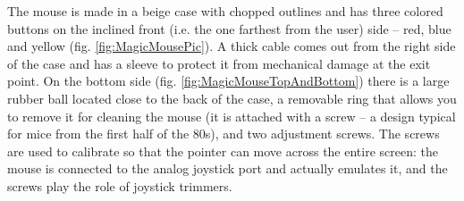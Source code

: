 \documentclass[11pt, a4paper]{article}
\begin{document}
The mouse is made in a beige case with chopped outlines and has three colored buttons on the inclined front (i.e. the one farthest from the user) side -- red, blue and yellow (fig. \ref{fig:MagicMousePic}). A thick cable comes out from the right side of the case and has a sleeve to protect it from mechanical damage at the exit point. On the bottom side (fig. \ref{fig:MagicMouseTopAndBottom}) there is a large rubber ball located close to the back of the case, a removable ring that allows you to remove it for cleaning the mouse (it is attached with a screw -- a design typical for mice from the first half of the 80s), and two adjustment screws. The screws are used to calibrate so that the pointer can move across the entire screen: the mouse is connected to the analog joystick port and actually emulates it, and the screws play the role of joystick trimmers.
\end{document}
